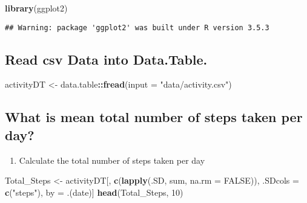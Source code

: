 \documentclass[]{article}
\newenvironment{Shaded}{\begin{snugshade}}{\end{snugshade}}
\newcommand{\KeywordTok}[1]{\textcolor[rgb]{0.13,0.29,0.53}{\textbf{#1}}}
\newcommand{\DataTypeTok}[1]{\textcolor[rgb]{0.13,0.29,0.53}{#1}}
\newcommand{\DecValTok}[1]{\textcolor[rgb]{0.00,0.00,0.81}{#1}}
\newcommand{\StringTok}[1]{\textcolor[rgb]{0.31,0.60,0.02}{#1}}
\newcommand{\OtherTok}[1]{\textcolor[rgb]{0.56,0.35,0.01}{#1}}
\newcommand{\OperatorTok}[1]{\textcolor[rgb]{0.81,0.36,0.00}{\textbf{#1}}}
\newcommand{\NormalTok}[1]{#1}
\providecommand{\tightlist}{%
  \setlength{\itemsep}{0pt}\setlength{\parskip}{0pt}}
\begin{document}
\begin{Shaded}
\begin{Highlighting}[]
\KeywordTok{library}\NormalTok{(ggplot2)}
\end{Highlighting}
\end{Shaded}

\begin{verbatim}
## Warning: package 'ggplot2' was built under R version 3.5.3
\end{verbatim}

\begin{Shaded}
\end{Shaded}

\subsection{Read csv Data into
Data.Table.}\label{read-csv-data-into-data.table.}

\begin{Shaded}
\begin{Highlighting}[]
\NormalTok{activityDT <-}\StringTok{ }\NormalTok{data.table}\OperatorTok{::}\KeywordTok{fread}\NormalTok{(}\DataTypeTok{input =} \StringTok{"data/activity.csv"}\NormalTok{)}
\end{Highlighting}
\end{Shaded}

\subsection{What is mean total number of steps taken per
day?}\label{what-is-mean-total-number-of-steps-taken-per-day}

\begin{enumerate}
\def\labelenumi{\arabic{enumi}.}
\tightlist
\item
  Calculate the total number of steps taken per day
\end{enumerate}

\begin{Shaded}
\begin{Highlighting}[]
\NormalTok{Total_Steps <-}\StringTok{ }\NormalTok{activityDT[, }\KeywordTok{c}\NormalTok{(}\KeywordTok{lapply}\NormalTok{(.SD, sum, }\DataTypeTok{na.rm =} \OtherTok{FALSE}\NormalTok{)), .SDcols =}\StringTok{ }\KeywordTok{c}\NormalTok{(}\StringTok{"steps"}\NormalTok{), by =}\StringTok{ }\NormalTok{.(date)] }
\KeywordTok{head}\NormalTok{(Total_Steps, }\DecValTok{10}\NormalTok{)}
\end{Highlighting}
\end{Shaded}
\end{document}
